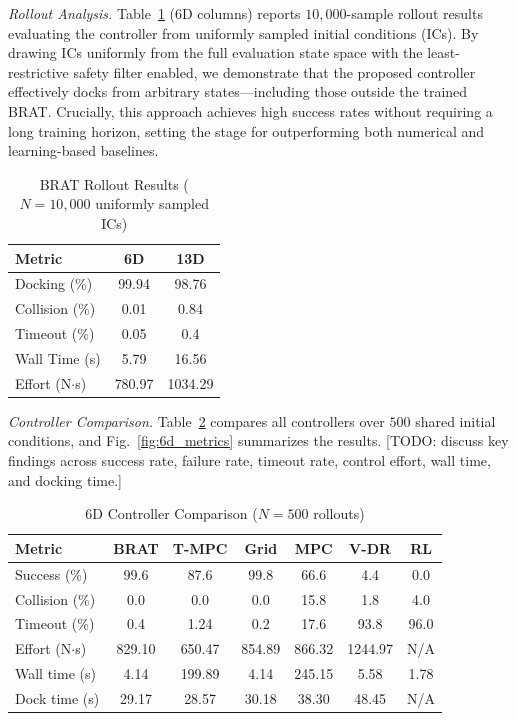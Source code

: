 \documentclass[letterpaper, 10 pt, conference]{ieeeconf}
\begin{document}
\textit{Rollout Analysis.} Table~\ref{tab:brat_rollouts} (6D columns) reports $10{,}000$-sample rollout results evaluating the controller from uniformly sampled initial conditions (ICs). By drawing ICs uniformly from the full evaluation state space with the least-restrictive safety filter enabled, we demonstrate that the proposed controller effectively docks from arbitrary states—including those outside the trained BRAT. Crucially, this approach achieves high success rates without requiring a long training horizon, setting the stage for outperforming both numerical and learning-based baselines.

\begin{table}[t]
\caption{BRAT Rollout Results ($N = 10{,}000$ uniformly sampled ICs)}
\label{tab:brat_rollouts}
\centering
\begin{tabular}{lcc}
\toprule
Metric & 6D & 13D \\
\midrule
Docking (\%) & 99.94 & 98.76 \\
Collision (\%) &  0.01 & 0.84 \\
Timeout (\%) &  0.05 & 0.4 \\
Wall Time (s) &  5.79 & 16.56 \\
Effort (N$\cdot$s) & 780.97 & 1034.29 \\
\bottomrule
\end{tabular}
\end{table}

\textit{Controller Comparison.}
Table~\ref{tab:6d_comparison} compares all controllers over $500$ shared initial conditions, and Fig.~\ref{fig:6d_metrics} summarizes the results. [TODO: discuss key findings across success rate, failure rate, timeout rate, control effort, wall time, and docking time.]

\begin{table}[t!]
\caption{6D Controller Comparison ($N = 500$ rollouts)}
\label{tab:6d_comparison}
\centering
\begin{tabular}{lcccccc}
\toprule
Metric & BRAT & T-MPC & Grid & MPC & V-DR & RL \\
\midrule
Success (\%)       & 99.6   & 87.6   & 99.8    & 66.6   & 4.4    & 0.0 \\
Collision (\%)     & 0.0    & 0.0    & 0.0     & 15.8   & 1.8    & 4.0 \\
Timeout (\%)       & 0.4    & 1.24   & 0.2     & 17.6   & 93.8   & 96.0 \\
Effort (N$\cdot$s) & 829.10 & 650.47 & 854.89  & 866.32 & 1244.97 & N/A \\
Wall time (s)      & 4.14   & 199.89 & 4.14    & 245.15 & 5.58 & 1.78 \\
Dock time (s)      & 29.17  & 28.57  & 30.18   & 38.30  & 48.45 & N/A \\
\bottomrule
\end{tabular}
\end{table}
\end{document}

